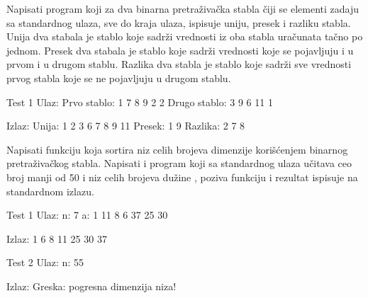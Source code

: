 \begin{Answer}[ref=707]
\end{Answer}


\begin{Exercise}[label=708]
Napisati program koji za dva binarna pretraživačka stabla čiji se elementi zadaju sa standardnog ulaza, sve do kraja ulaza, ispisuje uniju, presek i razliku stabla. Unija dva stabala je stablo koje sadrži vrednosti iz oba stabla uračunata tačno po jednom. Presek dva stabala je stablo koje sadrži vrednosti koje se pojavljuju i u prvom i u drugom stablu. Razlika dva stabla je stablo koje sadrži sve vrednosti prvog stabla koje se ne pojavljuju u drugom stablu. 

\begin{miditest}
\begin{test}{Test 1}
Ulaz:
Prvo stablo: 1 7 8 9 2 2
Drugo stablo: 3 9 6 11 1

Izlaz:
Unija: 1 2 3 6 7 8 9 11
Presek: 1 9 
Razlika: 2 7 8 
\end{test}
\end{miditest}

\end{Exercise}

\begin{Answer}[ref=708]
\end{Answer}


\begin{Exercise}[label=709]
Napisati funkciju  koja sortira niz celih brojeva  dimenzije  korišćenjem binarnog pretraživačkog stabla. Napisati i program koji sa standardnog ulaza učitava ceo broj  manji od 50 i niz  celih brojeva dužine , poziva funkciju  i rezultat ispisuje na standardnom izlazu.  

\begin{miditest}
\begin{test}{Test 1}
Ulaz:
n: 7 
a: 1 11 8 6 37 25 30

Izlaz:
1 6 8 11 25 30 37 
\end{test}
\end{miditest}

\begin{maxitest}
\begin{test}{Test 2}
Ulaz:
n: 55 

Izlaz:
Greska: pogresna dimenzija niza!
\end{test}
\end{maxitest}
\end{Exercise}

